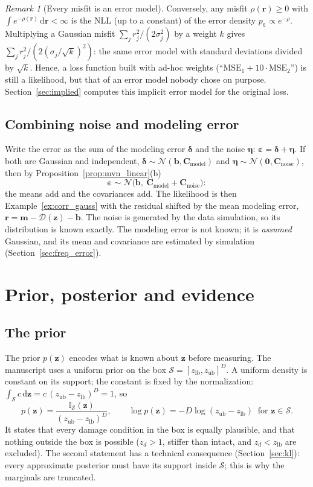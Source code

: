 \documentclass[11pt,a4paper]{article}
\numberwithin{equation}{section}
\theoremstyle{plain}
\theoremstyle{definition}
\theoremstyle{remark}
\newtheorem{remark}[proposition]{Remark}
\newcommand{\m}{\mathbf{m}}
\newcommand{\z}{\mathbf{z}}
\newcommand{\rr}{\mathbf{r}}
\newcommand{\bb}{\mathbf{b}}
\newcommand{\eps}{\bm{\varepsilon}}
\newcommand{\Cb}{\mathbf{C}}
\newcommand{\Sset}{\mathcal{S}}
\newcommand{\N}{\mathcal{N}}
\newcommand{\Dc}{\mathcal{D}}
\newcommand{\dd}{\,\mathrm{d}}
\newcommand{\zlb}{z_{\text{lb}}}
\newcommand{\zub}{z_{\text{ub}}}
\newcommand{\ind}{\mathbb{I}}
\begin{document}
\begin{remark}[Every misfit is an error model]
\label{rem:misfit}
Conversely, any misfit $\rho(\rr)\ge0$ with $\int e^{-\rho(\rr)}\dd\rr<\infty$ is the NLL (up to a constant) of the error density $p_{\eps}\propto e^{-\rho}$. Multiplying a Gaussian misfit $\sum_jr_j^2/(2\sigma_j^2)$ by a weight $k$ gives $\sum_jr_j^2/(2(\sigma_j/\sqrt k)^2)$: the same error model with standard deviations divided by $\sqrt k$. Hence, a loss function built with ad-hoc weights (``$\text{MSE}_1+10\cdot\text{MSE}_2$'') is still a likelihood, but that of an error model nobody chose on purpose. Section~\ref{sec:implied} computes this implicit error model for the original loss.
\end{remark}

\subsection{Combining noise and modeling error}
\label{sec:combine}
Write the error as the sum of the modeling error $\bm\delta$ and the noise $\bm\eta$: $\eps=\bm\delta+\bm\eta$. If both are Gaussian and independent, $\bm\delta\sim\N(\bb,\Cb_{\text{model}})$ and $\bm\eta\sim\N(\mathbf0,\Cb_{\text{noise}})$, then by Proposition~\ref{prop:mvn_linear}(b)
\begin{equation}
\eps\sim\N\big(\bb,\ \Cb_{\text{model}}+\Cb_{\text{noise}}\big):
\end{equation}
the means add and the covariances add. The likelihood is then Example~\ref{ex:corr_gauss} with the residual shifted by the mean modeling error, $\rr=\m-\Dc(\z)-\bb$.
The noise is generated by the data simulation, so its distribution is known exactly. The modeling error is not known; it is \emph{assumed} Gaussian, and its mean and covariance are estimated by simulation (Section~\ref{sec:freq_error}).

\section{Prior, posterior and evidence}
\label{sec:bayes}

\subsection{The prior}
The prior $p(\z)$ encodes what is known about $\z$ before measuring. The manuscript uses a uniform prior on the box $\Sset=[\zlb,\zub]^D$. A uniform density is constant on its support; the constant is fixed by the normalization: $\int_{\Sset} c\dd\z=c\,(\zub-\zlb)^D=1$, so
\begin{equation}
p(\z)=\frac{\ind_{\Sset}(\z)}{(\zub-\zlb)^D},\qquad \log p(\z)=-D\log(\zub-\zlb)\ \text{ for }\z\in\Sset.
\label{eq:prior}
\end{equation}
It states that every damage condition in the box is equally plausible, and that nothing outside the box is possible ($z_d>1$, stiffer than intact, and $z_d<\zlb$ are excluded).
The second statement has a technical consequence (Section~\ref{sec:kl}): every approximate posterior must have its support inside $\Sset$; this is why the marginals are truncated.
\end{document}
